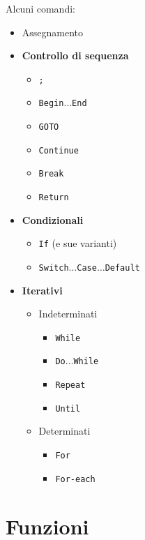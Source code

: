 \documentclass{article}
\begin{document}
Alcuni comandi:
\begin{itemize}
    \item Assegnamento
    \item \textbf{Controllo di sequenza}
        \begin{itemize}
            \item \texttt{;}
            \item \texttt{Begin}$\ldots$\texttt{End}
            \item \texttt{GOTO}
            \item \texttt{Continue}
            \item \texttt{Break}
            \item \texttt{Return}
        \end{itemize}
    \item \textbf{Condizionali}
        \begin{itemize}
            \item \texttt{If} (e sue varianti)
            \item \texttt{Switch}$\ldots$\texttt{Case}$\ldots$\texttt{Default}
        \end{itemize}
    \item \textbf{Iterativi}
        \begin{itemize}
            \item Indeterminati
                \begin{itemize}
                    \item \texttt{While}
                    \item \texttt{Do}$\ldots$\texttt{While}
                    \item \texttt{Repeat}
                    \item \texttt{Until}
                \end{itemize}
            \item Determinati
                \begin{itemize}
                    \item \texttt{For}
                    \item \texttt{For-each}
                \end{itemize}
        \end{itemize}
\end{itemize}

\newpage

\section{Funzioni}
\end{document}
